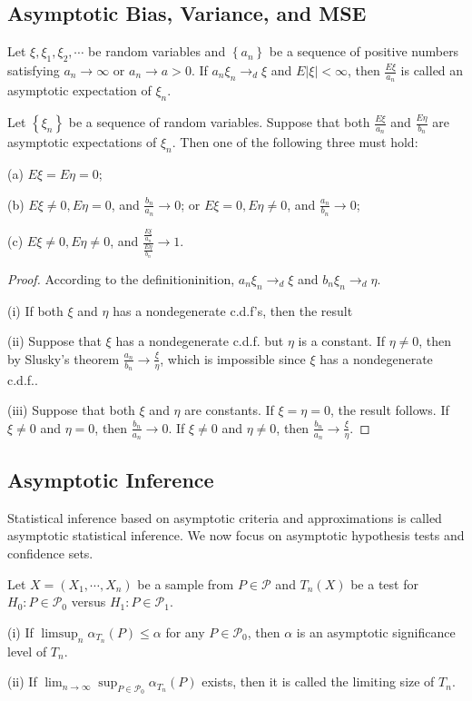 \subsection{Asymptotic Bias, Variance, and MSE}
\begin{definition}
Let $\xi,\xi_1,\xi_2,\cdots$ be random variables and $\left\{a_n\right\}$ be a sequence of positive numbers satisfying $a_n\to\infty$ or $a_n\to a>0$. If $a_n\xi_n\to_d\xi$ and $E\left|\xi\right|<\infty$, then $\frac{E\xi}{a_n}$ is called an asymptotic expectation of $\xi_n$.
\end{definition}
\begin{lemma}

\end{lemma}
\begin{theorem}
Let $\left\{\xi_n\right\}$ be a sequence of random variables. Suppose that both $\frac{E\xi}{a_n}$ and $\frac{E\eta}{b_n}$ are asymptotic expectations of $\xi_n$. Then one of the following three must hold:\par
(a) $E\xi=E\eta=0$;\par
(b) $E\xi\ne0,E\eta=0$, and $\frac{b_n}{a_n}\to0$; or $E\xi=0,E\eta\ne0$, and $\frac{a_n}{b_n}\to0$;\par
(c) $E\xi\ne0,E\eta\ne0$, and $\frac{\frac{E\xi}{a_n}}{\frac{E\eta}{b_n}}\to 1$.
\end{theorem}
\begin{proof}
According to the definitioninition, $a_n\xi_n\to_d\xi$ and $b_n\xi_n\to_d\eta$.\par
(i) If both $\xi$ and $\eta$ has a nondegenerate c.d.f's, then the result \par
(ii) Suppose that $\xi$ has a nondegenerate c.d.f. but $\eta$ is a constant. If $\eta\ne0$, then by Slusky's theorem $\frac{a_n}{b_n}\to \frac{\xi}{\eta}$, which is impossible since $\xi$ has a nondegenerate c.d.f..\par
(iii) Suppose that both $\xi$ and $\eta$ are constants. If $\xi=\eta=0$, the result follows. If $\xi\ne0$ and $\eta=0$, then $\frac{b_n}{a_n}\to 0$. If $\xi\ne0$ and $\eta\ne0$, then $\frac{b_n}{a_n}\to  \frac{\xi}{\eta}$.
\end{proof}

\subsection{Asymptotic Inference}
Statistical inference based on asymptotic criteria and approximations is called asymptotic statistical inference. We now focus on asymptotic hypothesis tests and confidence sets.
\begin{definition}
Let $X=(X_1,\cdots,X_n)$ be a sample from $P\in\mathcal{P}$ and $T_n(X)$ be a test for $H_0:P\in\mathcal{P}_0$ versus $H_1:P\in\mathcal{P}_1$.\par
(i) If $\limsup_n \alpha_{T_n}(P)\le \alpha$ for any $P\in\mathcal{P}_0$, then $\alpha$ is an asymptotic significance level of $T_n$.\par
(ii) If $\lim_{n\to\infty} \sup_{P\in\mathcal{P}_0}\alpha_{T_n}(P)$ exists, then it is called the limiting size of $T_n$.\par

\end{definition}
